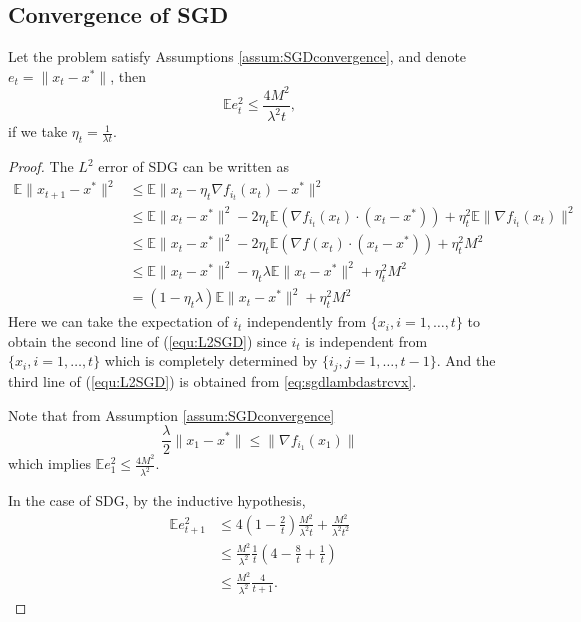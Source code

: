 \subsection{Convergence of SGD}
\begin{theorem}Let the problem satisfy Assumptions \ref{assum:SGDconvergence}, and denote $e_t = \|x_t - x^*\|$,
then %
\begin{equation}
\mathbb{E}e_{t}^2 \le \frac{4M^2}{\lambda^2 t},
\end{equation}
if we take $\eta_t = \frac{1}{\lambda t}$.
\end{theorem}
\begin{proof}
The $L^2$ error of SDG can be written as
\begin{equation}
      \label{equ:L2SGD}
      \begin{split}
            \mathbb{E} \|x_{t+1} - x^*\|^2 &\le \mathbb{E}\| x_{t} - \eta_t \nabla f_{i_t}(x_t) - x^* \|^2 \\
            &\le \mathbb{E} \|x_t - x^*\|^2 
            - 2 \eta_t \mathbb{E} (\nabla f_{i_t}(x_t) \cdot (x_t - x^*)) 
            + \eta_t^2 \mathbb{E} \|\nabla f_{i_t}(x_t)\|^2 \\
            & \le \mathbb{E} \|x_t - x^*\|^2 - 2 \eta_t \mathbb{E} (\nabla f (x_t) \cdot (x_t - x^*))
            + \eta_t^2 M^2 \\
            & \le \mathbb{E} \|x_t - x^*\|^2 -  \eta_t \lambda \mathbb{E} \|x_t - x^*\|^2 + \eta_t^2 M^2 \\
            & = (1 - \eta_t\lambda) \mathbb{E} \|x_t - x^*\|^2 + \eta_t^2 M^2
      \end{split}
\end{equation}
Here we can take the expectation of $i_t$ independently from $\{x_i, i = 1,\ldots,t\}$
to obtain the second line of (\ref{equ:L2SGD}) since $i_t$ is independent from 
$\{x_i, i = 1,\ldots,t\}$ which is completely determined by $\{i_j, j = 1,\ldots,t - 1\}$.
And the third line of (\ref{equ:L2SGD}) is obtained from \eqref{eq:sgdlambdastrcvx}.

Note that from Assumption \ref{assum:SGDconvergence}%
\begin{equation}
\frac{\lambda}{2} \|x_{1} - x^*\| \le \|\nabla f_{i_1}(x_{1})\|
\end{equation}
which implies $ \mathbb{E}e_{1}^2 \le \frac{4M^2}{\lambda^2}$.

In the case of SDG, by the inductive hypothesis, 
\begin{equation}
      \begin{split}
            \mathbb{E}e_{t+1}^2 & \le 4 (1 - \frac{2}{t}) \frac{M^2}{\lambda^2 t} + \frac{M^2}{\lambda^2 t^2} \\
            & \le \frac{M^2}{\lambda^2} \frac{1}{t}(4 - \frac{8}{t} + \frac{1}{t}) \\
            & \le \frac{M^2}{\lambda^2} \frac{4}{t+1}.
      \end{split}
\end{equation}
\end{proof}



